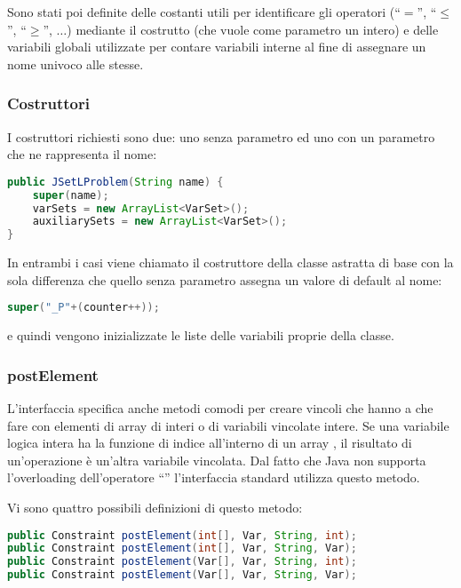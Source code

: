 Sono stati poi definite delle costanti utili per identificare gli operatori
(``$=$'', ``$\leq$'', ``$\geq$'', $\ldots$) 
mediante il costrutto  (che vuole come parametro un intero) e
delle variabili globali utilizzate per contare variabili interne al fine di 
assegnare un nome univoco alle stesse.

\subsubsection{Costruttori} 
I costruttori richiesti sono due: uno senza parametro ed uno con un parametro
 che ne rappresenta il nome:
\begin{lstlisting}[language = Java,
                   caption = {Costruttore con parametro.}]
public JSetLProblem(String name) {
	super(name);
	varSets = new ArrayList<VarSet>();
	auxiliarySets = new ArrayList<VarSet>();
}
\end{lstlisting}

In entrambi i casi viene chiamato il costruttore della classe astratta di base
con la sola differenza che quello senza parametro assegna un valore di
default al nome:
\begin{lstlisting}[language = Java, frame = single]
	super("_P"+(counter++));
\end{lstlisting} 
e quindi vengono inizializzate le liste delle variabili proprie della classe.

\subsubsection{postElement}
L'interfaccia  specifica anche metodi comodi per creare vincoli 
che hanno a che fare con elementi di array di interi o di variabili vincolate
intere. Se una variabile logica intera  ha la funzione di
indice all'interno di un array , il risultato di un'operazione
 è un'altra variabile vincolata. Dal fatto che Java
non supporta l'overloading dell'operatore ``\files{[]}'' l'interfaccia
standard utilizza questo metodo.

Vi sono quattro possibili definizioni di questo metodo:
\begin{lstlisting}[language = Java, frame = single]
public Constraint postElement(int[], Var, String, int);
public Constraint postElement(int[], Var, String, Var);
public Constraint postElement(Var[], Var, String, int);
public Constraint postElement(Var[], Var, String, Var);
\end{lstlisting}

